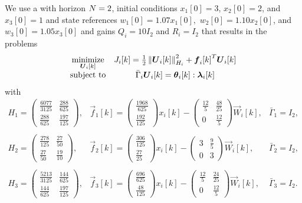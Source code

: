 \documentclass[../main.tex]{subfiles}
\begin{document}
We use a \dmpc{} with horizon ${N=2}$,
initial conditions
${x_{1}[0]=3}$,
${x_{2}[0]=2}$, and
${x_{3}[0]=1}$
and state references
${w_{1}[0]=1.07x_{1}[0]},$
${w_{2}[0]=1.10x_{2}[0]}$, and
${w_{3}[0]=1.05x_{3}[0]}$
and gains
$Q_{i}=10I_{2}$ and
$R_{i}=   I_{2}$
that results in the problems
\begin{equation}
  \begin{matrix}
    \minimize\limits_{\vec{U}_{i}[k]}&\obji=\frac{1}{2}\norm{\vec{U}_{i}[k]}^{2}_{H_{i}} + {\vec{f}_{i}[k]}^{T}\vec{U}_{i}[k]\\
    \mathrm{subject~ to} & \bar{\Gamma}_{i}\vec{U}_{i}[k] = \thetaik:\lambdaik
  \end{matrix}
  \label{eq:example_local_problem}
\end{equation}
with
\begin{equation}
  \label{eq:1}
  \begin{array}{lll}
H_1=\left(\begin{array}{cc} \frac{6077}{3125} & \frac{288}{625}\\ \frac{288}{625} & \frac{197}{125} \end{array}\right), & \vec{f}_1[k]=\left(\begin{array}{c} \frac{1968}{625}\\ \frac{192}{125} \end{array}\right)x_i[k]-\left(\begin{array}{cc} \frac{12}{5} & \frac{48}{25}\\ 0 & \frac{12}{5} \end{array}\right)\vec{W}_i[k], & \bar{\Gamma}_1=I_2,\\\\
H_2=\left(\begin{array}{cc} \frac{278}{125} & \frac{27}{50}\\ \frac{27}{50} & \frac{19}{10} \end{array}\right), & \vec{f}_2[k]=\left(\begin{array}{c} \frac{306}{125}\\ \frac{27}{25} \end{array}\right)x_i[k]-\left(\begin{array}{cc} 3 & \frac{9}{5}\\ 0 & 3 \end{array}\right)\vec{W}_i[k], & \bar{\Gamma}_2=I_2,\\\\
H_3=\left(\begin{array}{cc} \frac{5213}{3125} & \frac{144}{625}\\ \frac{144}{625} & \frac{197}{125} \end{array}\right), & \vec{f}_3[k]=\left(\begin{array}{c} \frac{696}{625}\\ \frac{48}{125} \end{array}\right)x_i[k]-\left(\begin{array}{cc} \frac{12}{5} & \frac{24}{25}\\ 0 & \frac{12}{5} \end{array}\right)\vec{W}_i[k], & \bar{\Gamma}_3=I_2.\\\\
  \end{array}
\end{equation}
\end{document}
